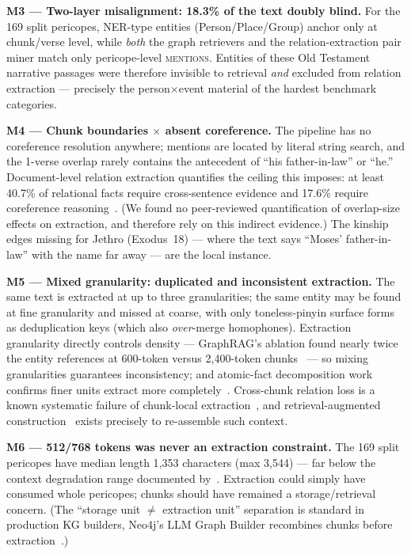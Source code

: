 \textbf{M3 --- Two-layer misalignment: 18.3\% of the text doubly blind.}
For the 169 split pericopes, NER-type entities (Person/Place/Group)
anchor only at chunk/verse level, while \emph{both} the graph retrievers
and the relation-extraction pair miner match only pericope-level
\textsc{mentions}. Entities of these Old Testament narrative passages
were therefore invisible to retrieval \emph{and} excluded from relation
extraction --- precisely the person$\times$event material of the hardest
benchmark categories.

\textbf{M4 --- Chunk boundaries $\times$ absent coreference.} The
pipeline has no coreference resolution anywhere; mentions are located by
literal string search, and the 1-verse overlap rarely contains the
antecedent of ``his father-in-law'' or ``he.'' Document-level relation
extraction quantifies the ceiling this imposes: at least 40.7\% of
relational facts require cross-sentence evidence and 17.6\% require
coreference reasoning~\cite{yao2019docred}. (We found no peer-reviewed
quantification of overlap-size effects on extraction, and therefore rely
on this indirect evidence.) The kinship edges missing for Jethro
(Exodus~18) --- where the text says ``Moses' father-in-law'' with the
name far away --- are the local instance.

\textbf{M5 --- Mixed granularity: duplicated and inconsistent
extraction.} The same text is extracted at up to three granularities;
the same entity may be found at fine granularity and missed at coarse,
with only toneless-pinyin surface forms as deduplication keys (which
also \emph{over}-merge homophones). Extraction granularity directly
controls density --- GraphRAG's ablation found nearly twice the entity
references at 600-token versus 2{,}400-token
chunks~\cite{edge2024graphrag} --- so mixing granularities guarantees
inconsistency; and atomic-fact decomposition work confirms finer units
extract more completely~\cite{lairgi2025atom}. Cross-chunk relation loss
is a known systematic failure of chunk-local
extraction~\cite{zhang2026crossaug}, and retrieval-augmented
construction~\cite{zhang2025rakg} exists precisely to re-assemble such
context.

\textbf{M6 --- 512/768 tokens was never an extraction constraint.} The
169 split pericopes have median length 1{,}353 characters (max
3{,}544) --- far below the context degradation range documented
by~\cite{liu2024lost}. Extraction could simply have consumed whole
pericopes; chunks should have remained a storage/retrieval concern. (The
``storage unit $\ne$ extraction unit'' separation is standard in
production KG builders, \eg Neo4j's LLM Graph Builder recombines chunks
before extraction~\cite{neo4jbuilder}.)


